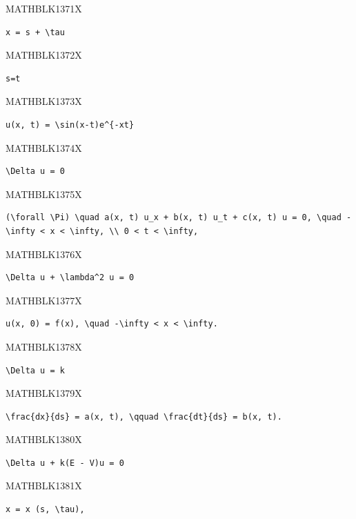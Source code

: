 \documentclass[
  ukrainian,
]{article}
\begin{document}
MATHBLK1371X

\begin{verbatim}
x = s + \tau
\end{verbatim}

MATHBLK1372X

\begin{verbatim}
s=t
\end{verbatim}

MATHBLK1373X

\begin{verbatim}
u(x, t) = \sin(x-t)e^{-xt}
\end{verbatim}

MATHBLK1374X

\begin{verbatim}
\Delta u = 0
\end{verbatim}

MATHBLK1375X

\begin{verbatim}
(\forall \Pi) \quad a(x, t) u_x + b(x, t) u_t + c(x, t) u = 0, \quad -\infty < x < \infty, \\ 0 < t < \infty,
\end{verbatim}

MATHBLK1376X

\begin{verbatim}
\Delta u + \lambda^2 u = 0
\end{verbatim}

MATHBLK1377X

\begin{verbatim}
u(x, 0) = f(x), \quad -\infty < x < \infty.
\end{verbatim}

MATHBLK1378X

\begin{verbatim}
\Delta u = k
\end{verbatim}

MATHBLK1379X

\begin{verbatim}
\frac{dx}{ds} = a(x, t), \qquad \frac{dt}{ds} = b(x, t).
\end{verbatim}

MATHBLK1380X

\begin{verbatim}
\Delta u + k(E - V)u = 0
\end{verbatim}

MATHBLK1381X

\begin{verbatim}
x = x (s, \tau),
\end{verbatim}
\end{document}
